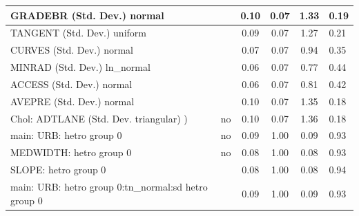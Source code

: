 \begin{table}
\begin{center}
\begin{tabular}{|l|l|c|c|c|l|}
			\hline
			GRADEBR (Std. Dev.) normal &  & 0.10 & 0.07 & 1.33 & 0.19 \\
			\hline
			TANGENT (Std. Dev.) uniform &  & 0.09 & 0.07 & 1.27 & 0.21 \\
			\hline
			CURVES (Std. Dev.) normal &  & 0.07 & 0.07 & 0.94 & 0.35 \\
			\hline
			MINRAD (Std. Dev.) ln_normal &  & 0.06 & 0.07 & 0.77 & 0.44 \\
			\hline
			ACCESS (Std. Dev.) normal &  & 0.06 & 0.07 & 0.81 & 0.42 \\
			\hline
			AVEPRE (Std. Dev.) normal &  & 0.10 & 0.07 & 1.35 & 0.18 \\
			\hline
			 Chol: ADTLANE (Std. Dev. triangular) ) & no & 0.10 & 0.07 & 1.36 & 0.18 \\
			\hline
			main: URB: hetro group 0 & no & 0.09 & 1.00 & 0.09 & 0.93 \\
			\hline
			MEDWIDTH: hetro group 0 & no & 0.08 & 1.00 & 0.08 & 0.93 \\
			\hline
			SLOPE: hetro group 0 &  & 0.08 & 1.00 & 0.08 & 0.94 \\
			\hline
			main: URB: hetro group 0:tn_normal:sd  hetro group 0 &  & 0.09 & 1.00 & 0.09 & 0.93 \\
			\hline
		\end{tabular}
	\end{center}
\end{table}